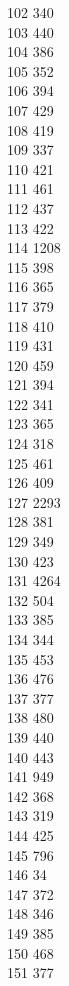 { 102	340 \\
 103	440 \\
 104	386 \\
 105	352 \\
 106	394 \\
 107	429 \\
 108	419 \\
 109	337 \\
 110	421 \\
 111	461 \\
 112	437 \\
 113	422 \\
 114	1208 \\
 115	398 \\
 116	365 \\
 117	379 \\
 118	410 \\
 119	431 \\
 120	459 \\
 121	394 \\
 122	341 \\
 123	365 \\
 124	318 \\
 125	461 \\
 126	409 \\
 127	2293 \\
 128	381 \\
 129	349 \\
 130	423 \\
 131	4264 \\
 132	504 \\
 133	385 \\
 134	344 \\
 135	453 \\
 136	476 \\
 137	377 \\
 138	480 \\
 139	440 \\
 140	443 \\
 141	949 \\
 142	368 \\
 143	319 \\
 144	425 \\
 145	796 \\
 146	34 \\
 147	372 \\
 148	346 \\
 149	385 \\
 150	468 \\
 151	377 \\
}
